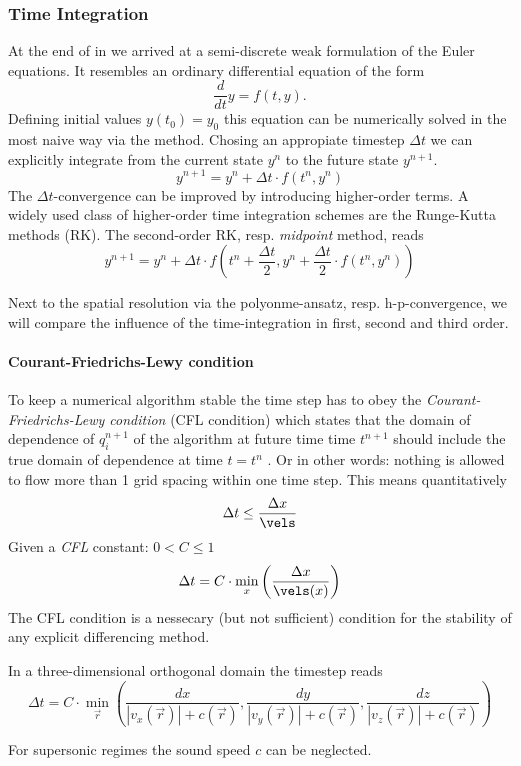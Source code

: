 \subsubsection{Time Integration}

At the end of  in  we arrived
at a semi-discrete weak formulation of the Euler equations. It resembles an ordinary
differential equation of the form
\begin{equation}
\frac{d}{dt}y = f(t,y).
\end{equation}
Defining initial values $y(t_0) = y_0$ this equation can be numerically solved
in the most naive way via the  method. Chosing an appropiate timestep $\Delta t$
we can explicitly integrate from the current state $y^n$ to the future state $y^{n+1}$.
\begin{equation}
    y^{n+1} = y^{n} + \Delta t \cdot f(t^n,y^n)
\end{equation}
The $\Delta t$-convergence can be improved by introducing higher-order terms. A
widely used class of higher-order time integration schemes are the Runge-Kutta
methods (RK). The second-order RK, resp. \emph{midpoint} method, reads
\begin{equation}
    y^{n+1} = y^{n} + \Delta t \cdot f\left(t^n + \frac{\Delta t}{2},y^n + \frac{\Delta t}{2} \cdot f(t^n,y^n)\right)
\end{equation}

Next to the spatial resolution via the polyonme-ansatz, resp. h-p-convergence,
we will compare the influence of the time-integration in first, second and
third order.

\paragraph{Courant-Friedrichs-Lewy condition}
To keep a numerical algorithm stable the time step has to obey the
\emph{Courant-Friedrichs-Lewy condition} (CFL condition) which states that the
domain of dependence of $q_i^{n+1}$ of the algorithm at future time time
$t^{n+1}$ should include the true domain of dependence at time $t = t^n$ . Or in
other words: nothing is allowed to flow more than 1 grid spacing within one
time step. This means quantitatively
\begin{equation}
    \Delta t \le \frac{\Delta x}{\vels}
\end{equation}
Given a \emph{CFL} constant: $0 < C \le 1$
\begin{equation}
    \Delta t = C \cdot \min_{x}\left(\frac{\Delta x}{\vels(x)}\right)
\end{equation}
The CFL condition is a nessecary (but not sufficient) condition for the
stability of any explicit differencing method.

In a three-dimensional orthogonal domain the timestep reads
\begin{equation}
    \Delta t = C \cdot \min_{\vec{r}}\left(
        \frac{dx}{|v_x(\vec{r})|+c(\vec{r})},
        \frac{dy}{|v_y(\vec{r})|+c(\vec{r})},
        \frac{dz}{|v_z(\vec{r})|+c(\vec{r})}\right)
\end{equation}

\remark For supersonic regimes the sound speed $c$ can be neglected.

